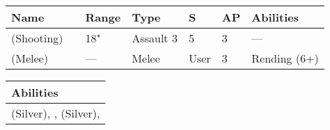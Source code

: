 \noindent
\begin{tabular}{||m{110pt} m{30pt} m{31pt} m{55pt} m{12pt} m{12pt} m{210pt}||}
	\hline
	Name & & Range & Type & S & AP & Abilities \\
	\hline
	\quickref{Staff of Light} (Shooting) & & 18" & Assault 3 & 5 & 3 & — \\
	\quickref{Staff of Light} (Melee) & & — & Melee & User & 3 & Rending (6+) \\
	\hline
\end{tabular}

\noindent
\begin{tabular}{||m{532pt}||}
	\hline
	Abilities \\
	\hline
	\quickref{Awakening Protocols}(Silver), \quickref{Living Metal}, \quickref{Nodal Command} (Silver), \quickref{Reanimation Protocols} \\
	\hline
\end{tabular}
